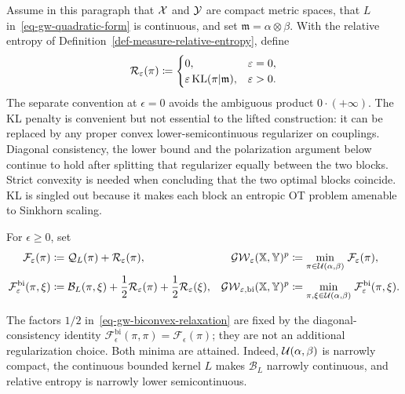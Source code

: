 Assume in this paragraph that $\mathcal{X}$ and $\mathcal{Y}$ are compact metric spaces, that $L$ in~\eqref{eq-gw-quadratic-form} is continuous, and set $\mathfrak m=\alpha\otimes\beta$. With the relative entropy of Definition~\ref{def-measure-relative-entropy}, define
\[
	\mathcal R_\varepsilon(\pi)
	\coloneqq
	\begin{cases}
		0, & \varepsilon=0,\\
		\varepsilon\operatorname{KL}(\pi|\mathfrak m), & \varepsilon>0.
	\end{cases}
\]
The separate convention at $\epsilon=0$ avoids the ambiguous product $0\cdot(+\infty)$.
The KL penalty is convenient but not essential to the lifted construction: it can be replaced by any proper convex lower-semicontinuous regularizer on couplings. Diagonal consistency, the lower bound and the polarization argument below continue to hold after splitting that regularizer equally between the two blocks. Strict convexity is needed when concluding that the two optimal blocks coincide. KL is singled out because it makes each block an entropic OT problem amenable to Sinkhorn scaling.

\begin{defn}\label{def-entropic-gw-biconvex}
For $\epsilon\geq0$, set
\begin{align}
	\mathcal F_\varepsilon(\pi)
	&\coloneqq \mathcal Q_L(\pi)+\mathcal R_\varepsilon(\pi),
	&
	\operatorname{\mathcal{GW}}_\varepsilon(\mathbb{X},\mathbb{Y})^p
	&\coloneqq \underset{\pi\in\mathcal{U}(\alpha,\beta)}{\min}\;\mathcal F_\varepsilon(\pi),
	\label{eq-gw-entropic-general}\\
	\mathcal F_\varepsilon^{\mathrm{bi}}(\pi,\xi)
	&\coloneqq \mathcal B_L(\pi,\xi)
	+\frac12\mathcal R_\varepsilon(\pi)
	+\frac12\mathcal R_\varepsilon(\xi),
	&
	\operatorname{\mathcal{GW}}_{\varepsilon,\mathrm{bi}}(\mathbb{X},\mathbb{Y})^p
	&\coloneqq \underset{\pi,\xi\in\mathcal{U}(\alpha,\beta)}{\min}\;
	\mathcal F_\varepsilon^{\mathrm{bi}}(\pi,\xi).
	\label{eq-gw-biconvex-relaxation}
\end{align}
\end{defn}
The factors $1/2$ in~\eqref{eq-gw-biconvex-relaxation} are fixed by the diagonal-consistency identity $\mathcal F_\epsilon^{\mathrm{bi}}(\pi,\pi)=\mathcal F_\epsilon(\pi)$; they are not an additional regularization choice.
Both minima are attained. Indeed, $\mathcal{U}(\alpha,\beta)$ is narrowly compact, the continuous bounded kernel $L$ makes $\mathcal B_L$ narrowly continuous, and relative entropy is narrowly lower semicontinuous.

